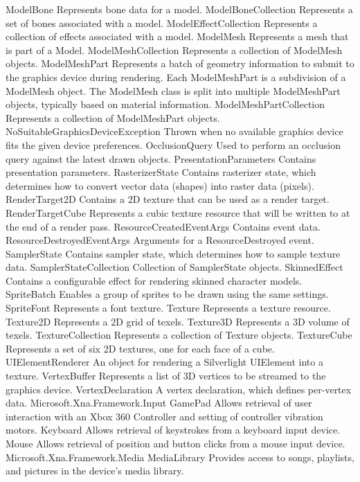 	ModelBone	Represents bone data for a model.
	ModelBoneCollection	Represents a set of bones associated with a model.
	ModelEffectCollection	Represents a collection of effects associated with a model.
	ModelMesh	Represents a mesh that is part of a Model.
	ModelMeshCollection	Represents a collection of ModelMesh objects.
	ModelMeshPart	 Represents a batch of geometry information to submit to the graphics device during rendering. Each ModelMeshPart is a subdivision of a ModelMesh object. The ModelMesh class is split into multiple ModelMeshPart objects, typically based on material information.
	ModelMeshPartCollection	Represents a collection of ModelMeshPart objects.
	NoSuitableGraphicsDeviceException	Thrown when no available graphics device fits the given device preferences.
	OcclusionQuery	Used to perform an occlusion query against the latest drawn objects.
	PresentationParameters	Contains presentation parameters.
	RasterizerState	Contains rasterizer state, which determines how to convert vector data (shapes) into raster data (pixels).
	RenderTarget2D	Contains a 2D texture that can be used as a render target.
	RenderTargetCube	Represents a cubic texture resource that will be written to at the end of a render pass.
	ResourceCreatedEventArgs	Contains event data.
	ResourceDestroyedEventArgs	Arguments for a ResourceDestroyed event.
	SamplerState	Contains sampler state, which determines how to sample texture data.
	SamplerStateCollection	Collection of SamplerState objects.
	SkinnedEffect	Contains a configurable effect for rendering skinned character models.
	SpriteBatch	Enables a group of sprites to be drawn using the same settings.
	SpriteFont	Represents a font texture.
	Texture	Represents a texture resource.
	Texture2D	Represents a 2D grid of texels.
	Texture3D	Represents a 3D volume of texels.
	TextureCollection	Represents a collection of Texture objects.
	TextureCube	Represents a set of six 2D textures, one for each face of a cube.
	UIElementRenderer	An object for rendering a Silverlight UIElement into a texture.
	VertexBuffer	Represents a list of 3D vertices to be streamed to the graphics device.
	VertexDeclaration	A vertex declaration, which defines per-vertex data.
Microsoft.Xna.Framework.Input
	GamePad	Allows retrieval of user interaction with an Xbox 360 Controller and setting of controller vibration motors.
	Keyboard	Allows retrieval of keystrokes from a keyboard input device.
	Mouse	Allows retrieval of position and button clicks from a mouse input device.
Microsoft.Xna.Framework.Media
	MediaLibrary	Provides access to songs, playlists, and pictures in the device's media library.
